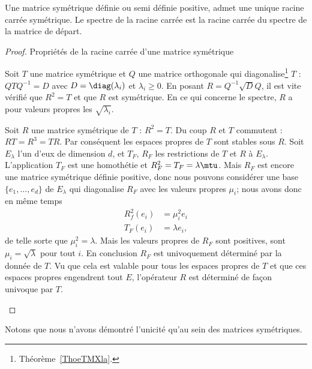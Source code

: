 \begin{proposition} \label{PropPEMDqVT}
	Une matrice symétrique définie ou semi définie positive, admet une unique racine carrée symétrique. Le spectre de la racine carrée est la racine carrée du spectre de la matrice de départ.
\end{proposition}

\begin{proof}
	Propriétés de la racine carrée d'une matrice symétrique
	\begin{subproof}
		\spitem[Existence]
		Soit \( T\) une matrice symétrique et \( Q\) une matrice orthogonale qui diagonalise\footnote{Théorème~\ref{ThoeTMXla}.} \( T\) : \( QTQ^{-1}=D\) avec \( D=\diag(\lambda_i)\) et \( \lambda_i\geq 0\). En posant \( R=Q^{-1}\sqrt{D}Q\), il est vite vérifié que \( R^2=T\) et que \( R\) est symétrique. En ce qui concerne le spectre, \( R\) a pour valeurs propres les \( \sqrt{\lambda_i}\).
		\spitem[Unicité]

		Soit \( R\) une matrice symétrique de \( T\) : \( R^2=T\). Du coup \( R\) et \( T\) commutent : \( RT=R^3=TR\). Par conséquent les espaces propres de \( T\) sont stables sous \( R\). Soit \( E_{\lambda} \) l'un d'eux de dimension \( d\), et \( T_F\), \( R_F\) les restrictions de \( T\) et \( R\) à \( E_{\lambda}\). L'application \( T_F\) est une homothétie et \( R_F^2=T_F=\lambda\mtu\). Mais \( R_F\) est encore une matrice symétrique définie positive, donc nous pouvons considérer une base \( \{ e_1,\ldots, e_d \}\) de \( E_{\lambda}\) qui diagonalise \( R_F\) avec les valeurs propres \( \mu_i\); nous avons donc en même temps
		\begin{subequations}
			\begin{align}
				R_f^2(e_i) & =\mu_i^2 e_i  \\
				T_F(e_i)   & =\lambda e_i,
			\end{align}
		\end{subequations}
		de telle sorte que \( \mu_i^2=\lambda\). Mais les valeurs propres de \( R_F\) sont positives, sont \( \mu_i=\sqrt{\lambda}\) pour tout \( i\). En conclusion \( R_F\) est univoquement déterminé par la donnée de \( T\). Vu que cela est valable pour tous les espaces propres de \( T\) et que ces espaces propres engendrent tout \( E\), l'opérateur \( R\) est déterminé de façon univoque par \( T\).
	\end{subproof}
\end{proof}
Notons que nous n'avons démontré l'unicité qu'au sein des matrices symétriques.

